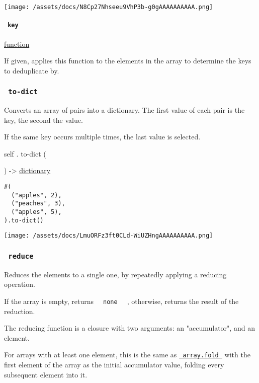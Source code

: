 \texttt{[image: /assets/docs/N8Cp27Nhseeu9VhP3b-g0gAAAAAAAAAA.png]}

\paragraph{\texorpdfstring{\texttt{\ key\ }}{ key }}\label{definitions-dedup-key}

\href{/docs/reference/foundations/function/}{function}

If given, applies this function to the elements in the array to
determine the keys to deduplicate by.

\subsubsection{\texorpdfstring{\texttt{\ to-dict\ }}{ to-dict }}\label{definitions-to-dict}

Converts an array of pairs into a dictionary. The first value of each
pair is the key, the second the value.

If the same key occurs multiple times, the last value is selected.

self { . } { to-dict } (

) -\textgreater{}
\href{/docs/reference/foundations/dictionary/}{dictionary}

\begin{verbatim}
#(
  ("apples", 2),
  ("peaches", 3),
  ("apples", 5),
).to-dict()
\end{verbatim}

\texttt{[image: /assets/docs/LmuORFz3ft0CLd-WiUZHngAAAAAAAAAA.png]}

\subsubsection{\texorpdfstring{\texttt{\ reduce\ }}{ reduce }}\label{definitions-reduce}

Reduces the elements to a single one, by repeatedly applying a reducing
operation.

If the array is empty, returns \texttt{\ }{\texttt{\ none\ }}\texttt{\ }
, otherwise, returns the result of the reduction.

The reducing function is a closure with two arguments: an "accumulator",
and an element.

For arrays with at least one element, this is the same as
\href{/docs/reference/foundations/array/\#definitions-fold}{\texttt{\ array.fold\ }}
with the first element of the array as the initial accumulator value,
folding every subsequent element into it.

